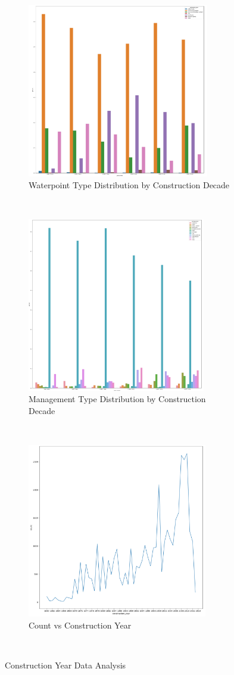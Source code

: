 \documentclass[conference]{IEEEtran}
\begin{document}
\begin{figure}[!htbp]
    \centering
    \begin{subfigure}[t]{0.5\textwidth}
        \centering
        \includegraphics[height=3in]{figures/tom_da_construction_year_1}
        \caption{Waterpoint Type Distribution by Construction Decade}
    \end{subfigure}%
    ~ 
    \begin{subfigure}[t]{0.5\textwidth}
        \centering
        \includegraphics[height=3in]{figures/tom_da_construction_year_2}
        \caption{Management Type Distribution by Construction Decade}
    \end{subfigure}
    ~
    \begin{subfigure}[t]{0.5\textwidth}
        \centering
        \includegraphics[height=3in]{figures/tom_da_construction_year_3}
        \caption{Count vs Construction Year}
    \end{subfigure}
    ~
    \caption{Construction Year Data Analysis}
    \label{fig:construction_year}
\end{figure}
    
\end{document}
